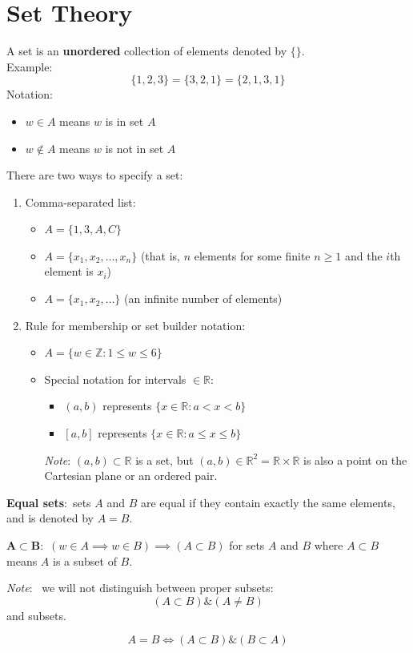 \documentclass[nobib]{tufte-handout}
\newcommand{\defn}[2]{
        \begin{defbox}
        \noindent\textbf{#1}:\ #2
        \end{defbox}
}
\newcommand{\note}[1]{
        \begin{notebox}
        \noindent\textit{Note}:\ #1
        \end{notebox}
}
\begin{document}
\section{Set Theory}
A set is an \textbf{unordered} collection of elements denoted by $\{ \}$.\\
Example:
\begin{equation*}
    \{1,2,3\} = \{3,2,1\} = \{2,1,3,1\}
\end{equation*}
Notation:
\begin{itemize}
    \item $w \in A$ means $w$ is in set $A$
    \item $w \not\in A$ means $w$ is not in set $A$
\end{itemize}
There are two ways to specify a set:
\begin{enumerate}
    \item Comma-separated list:
    \begin{itemize}
        \item $A = \{1,3,A,C\}$
        \item $A = \{ x_1, x_2, \ldots, x_n\}$ (that is, $n$ elements for some finite $n \geq 1$ and the $i$th element is $x_i$)
        \item $A = \{x_1,x_2, \ldots\}$ (an infinite number of elements)
    \end{itemize}
    \item  Rule for membership or set builder notation:
    \begin{itemize}
        \item $A = \{w \in \mathbb{Z} : 1\leq w \leq 6\}$
        \item Special notation for intervals $\in \mathbb{R}$:
        \begin{itemize}
            \item $(a,b)$ represents $\{x \in \mathbb{R}: a < x < b\}$
            \item $[a,b]$ represents $\{x \in \mathbb{R}: a \leq x \leq b\}$
        \end{itemize}
        \textit{Note}: $(a,b) \subset \mathbb{R}$ is a set, but $(a,b) \in \mathbb{R}^2 = \mathbb{R} \times \mathbb{R}$ is also a point on the Cartesian plane or an ordered pair.
    \end{itemize}
\end{enumerate}
\defn{Equal sets}{sets $A$ and $B$ are equal if they contain exactly the same elements, and is denoted by $A=B$.}
\defn{$\mathbf{A \subset B}$}{$(w\in A \implies w\in B)\implies (A \subset B)$ for sets $A$ and $B$ where $A \subset B$ means $A$ is a subset of $B$.}
\note{ we will not distinguish between proper subsets: 
\begin{equation*}
    (A\subset B) \&( A \neq B)
\end{equation*}
and subsets.}
\begin{equation*}
    A = B \iff (A \subset B) \& (B \subset A)
\end{equation*}
\end{document}
